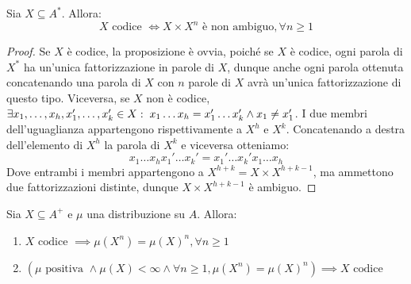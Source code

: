 \begin{proposition}\label{prop:code_iff_not_ambiguos}
  Sia \(X \subseteq A^*\). Allora:
  \[X \text{ codice } \iff X\times X^n \text{ è non ambiguo},\forall n \geq 1\]
\end{proposition}
\begin{proof}
  Se \(X\) è codice, la proposizione è ovvia, poiché se \(X\) è codice, ogni parola di \(X^*\) ha un'unica fattorizzazione in parole di \(X\), dunque anche ogni parola ottenuta concatenando una parola di \(X\) con \(n\) parole di \(X\) avrà un'unica fattorizzazione di questo tipo.
  Viceversa, se \(X\) non è codice, \(\exists x_1,\ldots,x_h,x_1',\ldots,x_k' \in X :\; x_1\ldots x_h = x_1'\ldots x_k' \land x_1 \neq x_1'\).
  I due membri dell'uguaglianza appartengono rispettivamente a \(X^h\) e \(X^k\).
  Concatenando a destra dell'elemento di \(X^h\) la parola di \(X^k\) e viceversa otteniamo:
  \[x_1\ldots x_h x_1'\ldots x_k' = x_1'\ldots x_k' x_1\ldots x_h\]
  Dove entrambi i membri appartengono a \(X^{h+k} = X \times X^{h+k-1}\), ma ammettono due fattorizzazioni distinte, dunque \(X \times X^{h+k-1}\) è ambiguo.
\end{proof}

\begin{proposition}
  Sia \(X \subseteq A^+\) e \(\mu\) una distribuzione su \(A\). Allora:
  \begin{enumerate}
    \item \(X \text{ codice } \implies \mu(X^n) = {\mu(X)}^n, \forall n \geq 1\)\label{item:code_implies_measure_product}
    \item \((\mu \text{ positiva } \land \mu(X) < \infty \land \forall n \geq 1, \mu(X^n) = {\mu(X)}^n )\implies X \text{ codice}\)\label{item:measure_product_implies_code}
  \end{enumerate}
\end{proposition}

